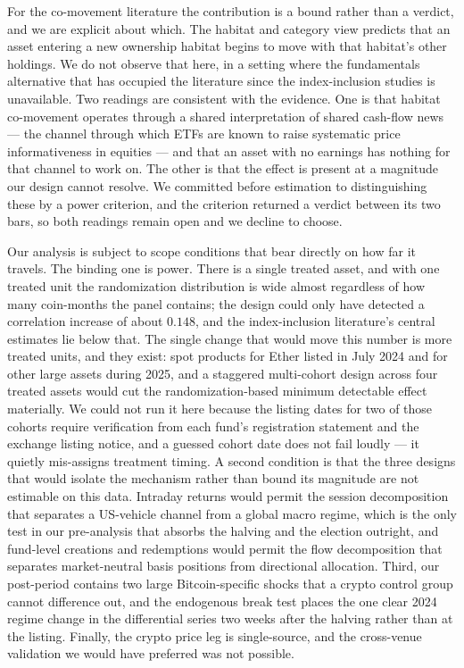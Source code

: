 \documentclass[12pt,a4paper]{article}
\begin{document}
For the co-movement literature the contribution is a bound rather than a verdict, and we are explicit about which. The habitat and category view predicts that an asset entering a new ownership habitat begins to move with that habitat's other holdings. We do not observe that here, in a setting where the fundamentals alternative that has occupied the literature since the index-inclusion studies is unavailable. Two readings are consistent with the evidence. One is that habitat co-movement operates through a shared interpretation of shared cash-flow news — the channel through which ETFs are known to raise systematic price informativeness in equities \citep{glosten2020etf} — and that an asset with no earnings has nothing for that channel to work on. The other is that the effect is present at a magnitude our design cannot resolve. We committed before estimation to distinguishing these by a power criterion, and the criterion returned a verdict between its two bars, so both readings remain open and we decline to choose.

Our analysis is subject to scope conditions that bear directly on how far it travels. The binding one is power. There is a single treated asset, and with one treated unit the randomization distribution is wide almost regardless of how many coin-months the panel contains; the design could only have detected a correlation increase of about $0.148$, and the index-inclusion literature's central estimates lie below that. The single change that would move this number is more treated units, and they exist: spot products for Ether listed in July 2024 and for other large assets during 2025, and a staggered multi-cohort design across four treated assets would cut the randomization-based minimum detectable effect materially. We could not run it here because the listing dates for two of those cohorts require verification from each fund's registration statement and the exchange listing notice, and a guessed cohort date does not fail loudly — it quietly mis-assigns treatment timing. A second condition is that the three designs that would isolate the mechanism rather than bound its magnitude are not estimable on this data. Intraday returns would permit the session decomposition that separates a US-vehicle channel from a global macro regime, which is the only test in our pre-analysis that absorbs the halving and the election outright, and fund-level creations and redemptions would permit the flow decomposition that separates market-neutral basis positions from directional allocation. Third, our post-period contains two large Bitcoin-specific shocks that a crypto control group cannot difference out, and the endogenous break test places the one clear 2024 regime change in the differential series two weeks after the halving rather than at the listing. Finally, the crypto price leg is single-source, and the cross-venue validation we would have preferred was not possible.
\end{document}
